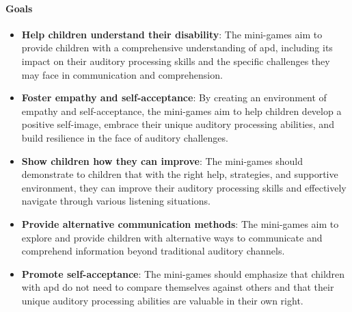 \paragraph{Goals}
\begin{itemize}
    \item \textbf{Help children understand their disability}: The mini-games aim to provide children with a comprehensive understanding of \gls{apd}, including its impact on their auditory processing skills and the specific challenges they may face in communication and comprehension.
    \item \textbf{Foster empathy and self-acceptance}: By creating an environment of empathy and self-acceptance, the mini-games aim to help children develop a positive self-image, embrace their unique auditory processing abilities, and build resilience in the face of auditory challenges.
    \item \textbf{Show children how they can improve}: The mini-games should demonstrate to children that with the right help, strategies, and supportive environment, they can improve their auditory processing skills and effectively navigate through various listening situations.
    \item \textbf{Provide alternative communication methods}: The mini-games aim to explore and provide children with alternative ways to communicate and comprehend information beyond traditional auditory channels.
    \item \textbf{Promote self-acceptance}: The mini-games should emphasize that children with \gls{apd} do not need to compare themselves against others and that their unique auditory processing abilities are valuable in their own right.
\end{itemize}

